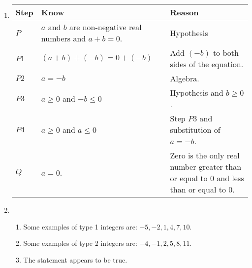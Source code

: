 \begin{enumerate}
\item
\begin{tabular}[t]{|p{0.4in}|p{1.6in}|p{1.6in}|}
  \hline
  \textbf{Step}  &  \textbf{Know}  &  \textbf{Reason} \\ \hline
  $P$  &  $a$ and $b$ are non-negative real numbers and $a + b = 0$.  &  Hypothesis \\ \hline
  $P1$ &  $\left( a + b \right) + \left( -b \right) = 0 + \left( -b \right)$        &  Add $\left( -b \right)$ to both sides of the equation. \\ \hline
  $P2$ &  $a = -b$  &  Algebra. \\ \hline
  $P3$ &  $a \geq 0$ and $-b \leq 0$ &  Hypothesis and $b \geq 0$. \\ \hline
  $P4$ &  $a \geq 0$ and $a \leq 0$  &  Step $P3$ and substitution of $a = -b$. \\ \hline
  $Q$  &  $a = 0$. &  Zero is the only real number greater than or equal to 0 and less than or equal to 0.\\ \hline
\end{tabular}


\item \begin{enumerate} 
\item  Some examples of type 1 integers are: $-5, -2, 1, 4, 7, 10$.
\item  Some examples of type 2 integers are: $-4, -1, 2, 5, 8, 11$.
\item  The statement appears to be true.
\end{enumerate}

%


\end{enumerate}

